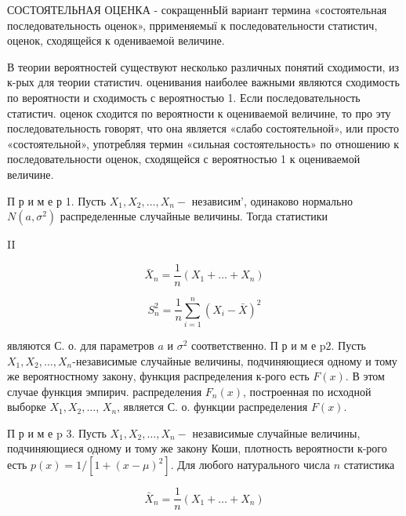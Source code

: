 \documentclass[10pt]{article}
\begin{document}
СОСТОЯТЕЛЬНАЯ ОЦЕНКА - сокращеннЫй вариант термина «состоятельная последовательность оценок», пррименяемыї к последовательности статистич, оценок, сходящейся к одениваемоӥ величине.



В теории вероятностей существуют несколько различных понятий сходимости, из к-рых для теории статистич. оценивания наиболее важными являются сходимость по вероятности и сходимость с вероятностью 1. Если последовательность статистич. оценок сходится по вероятности к оцениваемой величине, то про эту последовательность говорят, что она является «слабо состоятельной», или просто «состоятельной», употребляя термин «сильная состоятельность» по отношению к последовательности оценок, сходящейся с вероятностью 1 к оцениваемой величине.



П р и м е р 1. Пусть $X_{1}, X_{2}, \ldots, X_{n}-$ независим', одинаково нормально $N\left(a, \sigma^{2}\right)$ распределенные случайные величины. Тогда статистики



II



\[

\bar{X}_{n}=\frac{1}{n}\left(X_{1}+\ldots+X_{n}\right)

\]



\[

S_{n}^{2}=\frac{1}{n} \sum_{i=1}^{n}\left(X_{i}-\bar{X}\right)^{2}

\]



являются С. о. для параметров $a$ и $\sigma^{2}$ соответственно. П р и м е $\mathrm{p} 2$. Пусть $X_{1}, X_{2}, \ldots, X_{n}$-независимые случайные величины, подчиняющиеся одному и тому же вероятностному закону, функция распределения к-рого есть $F(x)$. В этом случае функция эмпирич. распределения $F_{n}(x)$, построенная по исходной выборке $X_{1}, X_{2}, \ldots$, $X_{n}$, является С. о. функции распределения $F(x)$.



П р и м е p 3. Пусть $X_{1}, X_{2}, \ldots, X_{n}-$ независимые случайные величины, подчиняющиеся одному и тому же закону Коши, плотность вероятности к-рого есть $p(x)=1 /\left[1+(x-\mu)^{2}\right]$. Для любого натурального числа $n$ статистика



\[

\bar{X}_{n}=\frac{1}{n}\left(X_{1}+\ldots+X_{n}\right)

\]
\end{document}
